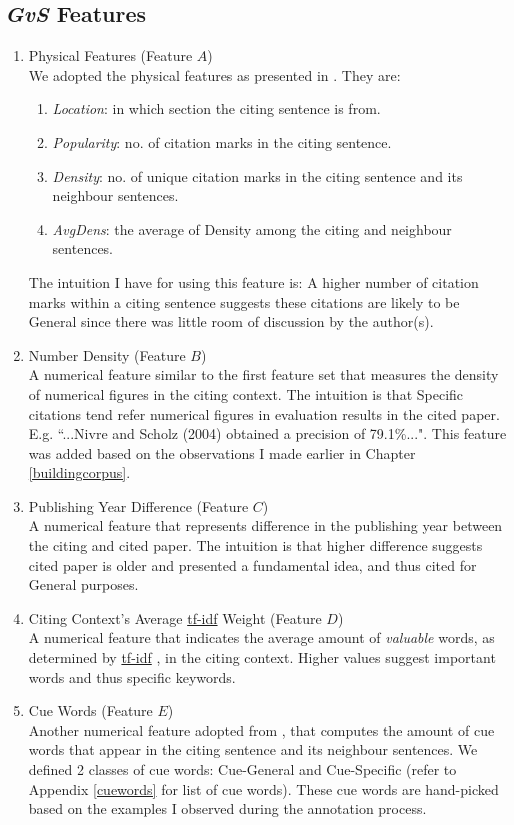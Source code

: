 \subsection*{{\it GvS} Features}
\begin{enumerate}
\item Physical Features (Feature $A$)\\
We adopted the physical features as presented in \cite{dongensemble}. They are:
\begin{enumerate}
\item \textit{Location}: in which section the citing sentence is from.
\item \textit{Popularity}: no. of citation marks in the citing sentence.
\item \textit{Density}: no. of unique citation marks in the citing sentence and its neighbour sentences.
\item \textit{AvgDens}: the average of Density among the citing and neighbour sentences.
\end{enumerate}
The intuition I have for using this feature is: A higher number of citation marks within a citing sentence suggests these citations are likely to be General since there was little room of discussion by the author(s).

\item Number Density (Feature $B$)\\
A numerical feature similar to the first feature set that measures the density of numerical figures in the citing context. The intuition is that Specific citations tend refer numerical figures in evaluation results in the cited paper. E.g. ``...Nivre and Scholz (2004) obtained a precision of 79.1\%...". This feature was added based on the observations I made earlier in Chapter \ref{buildingcorpus}.

\item Publishing Year Difference (Feature $C$)\\
A numerical feature that represents difference in the publishing year between the citing and cited paper. The intuition is that higher difference suggests cited paper is older and presented a fundamental idea, and thus cited for General purposes.

\item Citing Context's Average \url{tf-idf} Weight (Feature $D$)\\
A numerical feature that indicates the average amount of \textit{valuable} words, as determined by \url{tf-idf} \cite{irtextbook},  in the citing context. Higher values suggest important words and thus specific keywords.

\item Cue Words (Feature $E$)\\
Another numerical feature adopted from \cite{dongensemble}, that computes the amount of cue words that appear in the citing sentence and its neighbour sentences. We defined 2 classes of cue words: Cue-General and Cue-Specific (refer to Appendix \ref{cuewords} for list of cue words). These cue words are hand-picked based on the examples I observed during the annotation process.
\end{enumerate}

